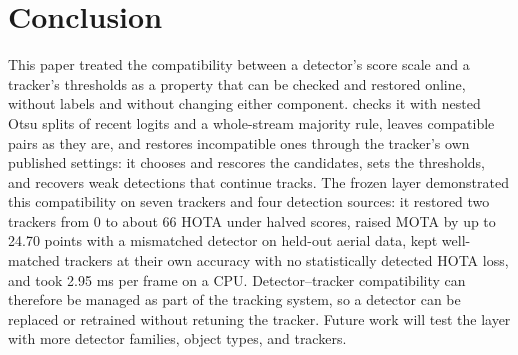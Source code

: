 \section{Conclusion}\label{sec:conclusion}

This paper treated the compatibility between a detector's score scale and a tracker's thresholds
as a property that can be checked and restored online, without labels and without changing either
component. \scl{} checks it with nested Otsu splits of recent logits and a whole-stream majority
rule, leaves compatible pairs as they are, and restores incompatible ones through the tracker's own
published settings: it chooses and rescores the candidates, sets the thresholds, and recovers weak
detections that continue tracks. The frozen layer demonstrated this compatibility on seven trackers
and four detection sources: it restored two trackers from 0 to about 66 HOTA under halved scores,
raised MOTA by up to 24.70 points with a mismatched detector on held-out aerial data, kept
well-matched trackers at their own accuracy with no statistically detected HOTA loss, and took
2.95 ms per frame on a CPU. Detector--tracker compatibility can therefore be managed as part of the tracking system, so a
detector can be replaced or retrained without retuning the tracker. Future work will test the layer
with more detector families, object types, and trackers.
